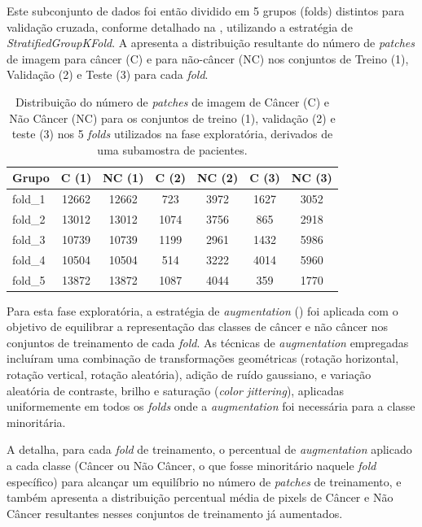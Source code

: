 Este subconjunto de dados foi então dividido em 5 grupos (folds) distintos para validação cruzada, conforme detalhado na , utilizando a estratégia de \textit{StratifiedGroupKFold}. A  apresenta a distribuição resultante do número de \textit{patches} de imagem para câncer (C) e para não-câncer (NC) nos conjuntos de Treino (1), Validação (2) e Teste (3) para cada \textit{fold}.

\begin{table}[!htp] 
\centering
\caption[Distribuição de imagens nos folds exploratórios (subamostra).]{Distribuição do número de \textit{patches} de imagem de Câncer (C) e Não Câncer (NC) para os conjuntos de treino (1), validação (2) e teste (3) nos 5 \textit{folds} utilizados na fase exploratória, derivados de uma subamostra de pacientes.}
\label{tab:distribuicao_folds_exploratorio}
\begin{tabular}{lcccccc}
\toprule
\textbf{Grupo} & \textbf{C (1)} & \textbf{NC (1)} & \textbf{C (2)} & \textbf{NC (2)} & \textbf{C (3)} & \textbf{NC (3)} \\ \midrule
fold\_1 & 12662 & 12662 & 723  & 3972 & 1627 & 3052 \\
fold\_2 & 13012 & 13012 & 1074 & 3756 & 865  & 2918 \\
fold\_3 & 10739 & 10739 & 1199 & 2961 & 1432 & 5986 \\
fold\_4 & 10504 & 10504 & 514  & 3222 & 4014 & 5960 \\
fold\_5 & 13872 & 13872 & 1087 & 4044 & 359  & 1770 \\ \bottomrule
\end{tabular}
\end{table}

Para esta fase exploratória, a estratégia de \textit{augmentation} () foi aplicada com o objetivo de equilibrar a representação das classes de câncer e não câncer nos conjuntos de treinamento de cada \textit{fold}. As técnicas de \textit{augmentation} empregadas incluíram uma combinação de transformações geométricas (rotação horizontal, rotação vertical, rotação aleatória), adição de ruído gaussiano, e variação aleatória de contraste, brilho e saturação (\textit{color jittering}), aplicadas uniformemente em todos os \textit{folds} onde a \textit{augmentation} foi necessária para a classe minoritária. 

A  detalha, para cada \textit{fold} de treinamento, o percentual de \textit{augmentation} aplicado a cada classe (Câncer ou Não Câncer, o que fosse minoritário naquele \textit{fold} específico) para alcançar um equilíbrio no número de \textit{patches} de treinamento, e também apresenta a distribuição percentual média de pixels de Câncer e Não Câncer resultantes nesses conjuntos de treinamento já aumentados.


